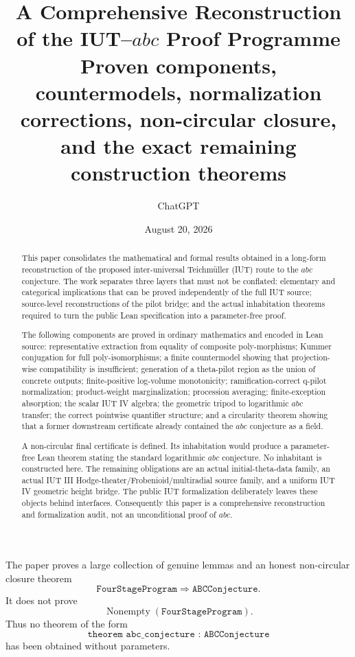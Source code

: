 \documentclass[11pt]{amsart}
\title[Comprehensive IUT--$abc$ reconstruction]{A Comprehensive Reconstruction of the IUT--$abc$ Proof Programme\\
\large Proven components, countermodels, normalization corrections, non-circular closure, and the exact remaining construction theorems}
\author{ChatGPT}
\date{August 20, 2026}
\theoremstyle{definition}
\theoremstyle{remark}
\begin{document}
\maketitle

\begin{abstract}
This paper consolidates the mathematical and formal results obtained in a
long-form reconstruction of the proposed inter-universal Teichm\"uller
(IUT) route to the $abc$ conjecture.  The work separates three layers that
must not be conflated: elementary and categorical implications that can be
proved independently of the full IUT source; source-level reconstructions of
the pilot bridge; and the actual inhabitation theorems required to turn the
public Lean specification into a parameter-free proof.

The following components are proved in ordinary mathematics and encoded in
Lean source: representative extraction from equality of composite
poly-morphisms; Kummer conjugation for full poly-isomorphisms; a finite
countermodel showing that projection-wise compatibility is insufficient;
generation of a theta-pilot region as the union of concrete outputs;
finite-positive log-volume monotonicity; ramification-correct q-pilot
normalization; product-weight marginalization; procession averaging;
finite-exception absorption; the scalar IUT IV algebra; the geometric tripod
to logarithmic $abc$ transfer; the correct pointwise quantifier structure;
and a circularity theorem showing that a former downstream certificate
already contained the $abc$ conjecture as a field.

A non-circular final certificate is defined.  Its inhabitation would produce
a parameter-free Lean theorem stating the standard logarithmic $abc$
conjecture.  No inhabitant is constructed here.  The remaining obligations
are an actual initial-theta-data family, an actual IUT III
Hodge-theater/Frobenioid/multiradial source family, and a uniform IUT IV
geometric height bridge.  The public IUT formalization deliberately leaves
these objects behind interfaces.  Consequently this paper is a comprehensive
reconstruction and formalization audit, not an unconditional proof of $abc$.
\end{abstract}

\begin{tcolorbox}[colback=yellow!5,colframe=black!65,title=Final status]
The paper proves a large collection of genuine lemmas and an honest
non-circular closure theorem
\[
  \texttt{FourStageProgram}\Longrightarrow\texttt{ABCConjecture}.
\]
It does not prove
\[
  \operatorname{Nonempty}(\texttt{FourStageProgram}).
\]
Thus no theorem of the form
\[
  \texttt{theorem abc\_conjecture : ABCConjecture}
\]
has been obtained without parameters.
\end{tcolorbox}
\end{document}
